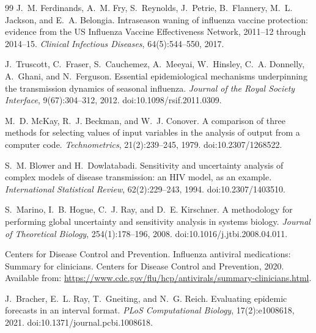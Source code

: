 \documentclass[12pt,a4paper]{article}
\theoremstyle{definition}
\theoremstyle{remark}
\begin{document}
\begin{thebibliography}{99}
J.~M. Ferdinands, A.~M. Fry, S.~Reynolds, J.~Petrie, B.~Flannery, M.~L. Jackson, and E.~A. Belongia.
\newblock Intraseason waning of influenza vaccine protection: evidence from the US Influenza Vaccine Effectiveness Network, 2011--12 through 2014--15.
\newblock \emph{Clinical Infectious Diseases}, 64(5):544--550, 2017.

J.~Truscott, C.~Fraser, S.~Cauchemez, A.~Meeyai, W.~Hinsley, C.~A. Donnelly, A.~Ghani, and N.~Ferguson.
\newblock Essential epidemiological mechanisms underpinning the transmission dynamics of seasonal influenza.
\newblock \emph{Journal of the Royal Society Interface}, 9(67):304--312, 2012.
\newblock doi:10.1098/rsif.2011.0309.


M.~D. McKay, R.~J. Beckman, and W.~J. Conover.
\newblock A comparison of three methods for selecting values of input variables in the analysis of output from a computer code.
\newblock \emph{Technometrics}, 21(2):239--245, 1979.
\newblock doi:10.2307/1268522.

S.~M. Blower and H.~Dowlatabadi.
\newblock Sensitivity and uncertainty analysis of complex models of disease transmission: an {HIV} model, as an example.
\newblock \emph{International Statistical Review}, 62(2):229--243, 1994.
\newblock doi:10.2307/1403510.

S.~Marino, I.~B. Hogue, C.~J. Ray, and D.~E. Kirschner.
\newblock A methodology for performing global uncertainty and sensitivity analysis in systems biology.
\newblock \emph{Journal of Theoretical Biology}, 254(1):178--196, 2008.
\newblock doi:10.1016/j.jtbi.2008.04.011.


Centers for Disease Control and Prevention.
\newblock Influenza antiviral medications: Summary for clinicians.
\newblock Centers for Disease Control and Prevention, 2020.
\newblock Available from: \url{https://www.cdc.gov/flu/hcp/antivirals/summary-clinicians.html}.


J.~Bracher, E.~L. Ray, T.~Gneiting, and N.~G. Reich.
\newblock Evaluating epidemic forecasts in an interval format.
\newblock \emph{PLoS Computational Biology}, 17(2):e1008618, 2021.
\newblock doi:10.1371/journal.pcbi.1008618.


\end{thebibliography}
\end{document}
